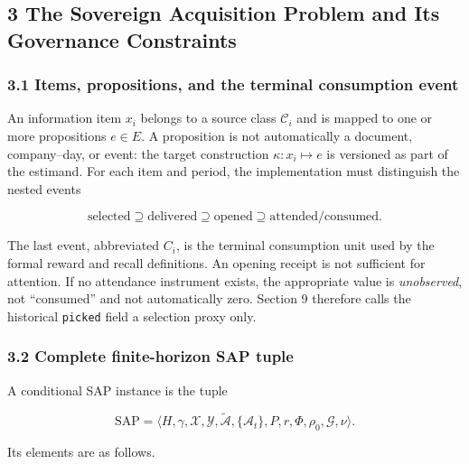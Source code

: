\documentclass[
  11pt]{article}
\begin{document}
\subsection{3 The Sovereign Acquisition Problem and Its Governance
Constraints}\label{the-sovereign-acquisition-problem-and-its-governance-constraints}

\subsubsection{3.1 Items, propositions, and the terminal consumption
event}\label{items-propositions-and-the-terminal-consumption-event}

An information item \(x_i\) belongs to a source class \(\mathcal C_i\)
and is mapped to one or more propositions \(e\in E\). A proposition is
not automatically a document, company--day, or event: the target
construction \(\kappa:x_i\mapsto e\) is versioned as part of the
estimand. For each item and period, the implementation must distinguish
the nested events

\[\mathrm{selected}\supseteq\mathrm{delivered}\supseteq\mathrm{opened}\supseteq\mathrm{attended/consumed}.\]

The last event, abbreviated \(C_i\), is the terminal consumption unit
used by the formal reward and recall definitions. An opening receipt is
not sufficient for attention. If no attendance instrument exists, the
appropriate value is \emph{unobserved}, not ``consumed'' and not
automatically zero. Section 9 therefore calls the historical
\texttt{picked} field a selection proxy only.

\subsubsection{3.2 Complete finite-horizon SAP
tuple}\label{complete-finite-horizon-sap-tuple}

A conditional SAP instance is the tuple

\[\mathrm{SAP}=\langle H,\gamma,\mathcal X,\mathcal Y,\widetilde{\mathcal A},\{\mathcal A_t\},P,r,\Phi,\rho_0,\mathcal G,\nu\rangle.\tag{1}\]

Its elements are as follows.
\end{document}
